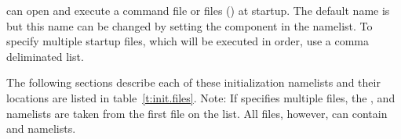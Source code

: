 \tao can open and execute a command file or files () at startup.  The
default name is  but this name can be changed by setting the 
component in the  namelist. To specify multiple startup files, which will be executed
in order, use a comma deliminated list.

The following sections describe each of these initialization namelists and their locations are
listed in table~\ref{t:init.files}. Note: If  specifies multiple files, the
,  and  namelists are taken from the
first file on the list. All files, however, can contain  and
 namelists.

